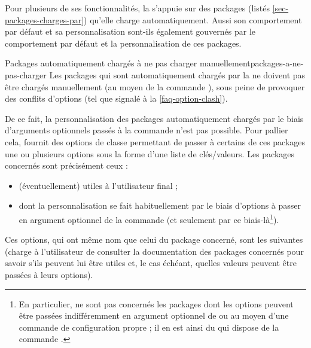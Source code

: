 %
%
Pour plusieurs de ses fonctionnalités, la \yatCl s'appuie sur des packages
(listés \vref{sec-packages-charges-par}) qu'elle charge automatiquement. Aussi
son comportement par défaut et sa personnalisation sont-ils également gouvernés
par le comportement par défaut et la personnalisation de ces packages.

\begin{dbwarning}{Packages automatiquement chargés à ne pas charger
    manuellement}{packages-a-ne-pas-charger}
  Les packages qui sont automatiquement chargés par la \yatCl{} ne doivent pas
  être chargés manuellement (au moyen de la commande
  ), sous peine de provoquer des conflits d'options
  (tel que signalé à la \vref{faq-option-clash}).
\end{dbwarning}

De ce fait, la personnalisation des packages automatiquement chargés par le
biais d'arguments optionnels passés à la commande 
n'est pas possible. Pour pallier cela, \yat{} fournit des options de classe
permettant de passer à certains de ces packages une ou plusieurs options sous
la forme d'une liste de clés/valeurs. Les packages concernés sont précisément
ceux :
\begin{itemize}
\item (éventuellement) utiles à l'utilisateur final ;
\item dont la personnalisation se fait habituellement par le biais d'options
  à passer en argument optionnel de la commande  (et
  seulement par ce biais-là\footnote{En particulier, ne sont pas concernés les
    packages dont les options peuvent être passées indifféremment en argument
    optionnel de \protect{} ou au moyen d'une commande
    de configuration propre ; il en est ainsi du  qui dispose
    de la commande \protect{}.}).
\end{itemize}
Ces options, qui ont même nom que celui du package concerné, sont les suivantes
(charge à l'utilisateur de consulter la documentation des packages concernés
pour savoir s'ils peuvent lui être utiles et, le cas échéant, quelles valeurs
peuvent être passées à leurs options).

